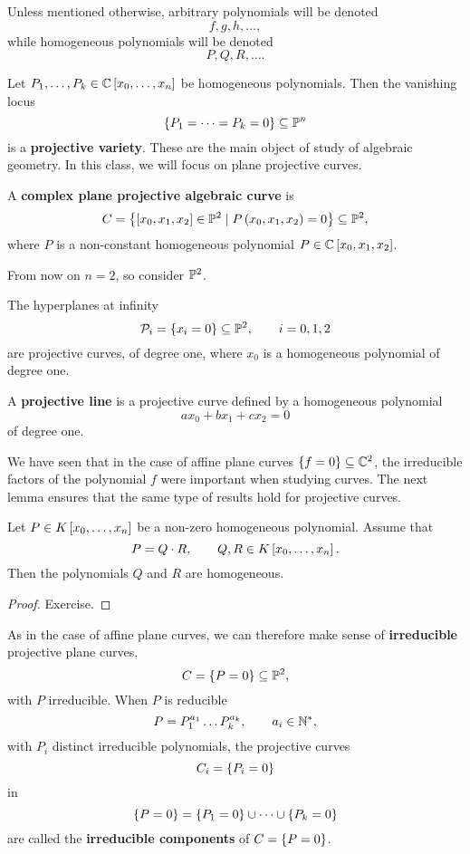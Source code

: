 \begin{notation}
Unless mentioned otherwise, arbitrary polynomials will be denoted
$$ f, g, h, \dots, $$
while homogeneous polynomials will be denoted
$$ P, Q, R, \dots. $$
\end{notation}

Let $ P_1, \dots, P_k \in \C\sb{x_0, \dots, x_n} $ be homogeneous polynomials. Then the vanishing locus
$$ \cb{P_1 = \dots = P_k = 0} \subseteq \P^n $$
is a \textbf{projective variety}. These are the main object of study of algebraic geometry. In this class, we will focus on plane projective curves.

\begin{definition}
A \textbf{complex plane projective algebraic curve} is
$$ C = \cb{\sb{x_0, x_1, x_2} \in \P^2 \mid P\rb{x_0, x_1, x_2} = 0} \subseteq \P^2, $$
where $ P $ is a non-constant homogeneous polynomial $ P \in \C\sb{x_0, x_1, x_2} $.
\end{definition}

From now on $ n = 2 $, so consider $ \P^2 $.

\begin{example}
The hyperplanes at infinity
$$ \PP_i = \cb{x_i = 0} \subseteq \P^2, \qquad i = 0, 1, 2 $$
are projective curves, of degree one, where $ x_0 $ is a homogeneous polynomial of degree one.
\end{example}

\begin{definition}
A \textbf{projective line} is a projective curve defined by a homogeneous polynomial
$$ ax_0 + bx_1 + cx_2 = 0 $$
of degree one.
\end{definition}

We have seen that in the case of affine plane curves $ \cb{f = 0} \subseteq \C^2 $, the irreducible factors of the polynomial $ f $ were important when studying curves. The next lemma ensures that the same type of results hold for projective curves.

\begin{lemma}
\label{lem:4.10}
Let $ P \in K\sb{x_0, \dots, x_n} $ be a non-zero homogeneous polynomial. Assume that
$$ P = Q \cdot R, \qquad Q, R \in K\sb{x_0, \dots, x_n}. $$
Then the polynomials $ Q $ and $ R $ are homogeneous.
\end{lemma}

\begin{proof}
Exercise.
\end{proof}

\begin{remark}
As in the case of affine plane curves, we can therefore make sense of \textbf{irreducible} projective plane curves,
$$ C = \cb{P = 0} \subseteq \P^2, $$
with $ P $ irreducible. When $ P $ is reducible
$$ P = P_1^{a_1} \dots P_k^{a_k}, \qquad a_i \in \N^*, $$
with $ P_i $ distinct irreducible polynomials, the projective curves
$$ C_i = \cb{P_i = 0} $$
in
$$ \cb{P = 0} = \cb{P_1 = 0} \cup \dots \cup \cb{P_k = 0} $$
are called the \textbf{irreducible components} of $ C = \cb{P = 0} $.
\end{remark}

